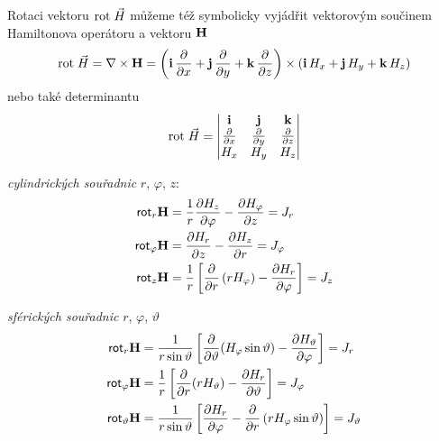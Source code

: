       Rotaci vektoru $\mathrm{rot}\;\vec{H}$ můžeme též symbolicky vyjádřit vektorovým součinem Hamiltonova
      operátoru a vektoru $\mathbf{H}$
      \begin{equation}\label{TEMP:eq_amp_z7}
        \mathrm{rot}\;\vec{H}  = \nabla\times\mathbf{H} = \left(\mathbf{i}\,\frac{\partial  }{\partial x} + 
                   \mathbf{j}\,\frac{\partial  }{\partial y} + \mathbf{k}\,\frac{\partial  }{\partial z}\right)\times(\mathbf{i}\,H_x +
                   \mathbf{j}\,H_y + \mathbf{k}\,H_z)
      \end{equation}         
      nebo také determinantu
      \begin{equation}\label{TEMP:eq_amp_z8}
        \mathrm{rot}\;\vec{H} = \begin{vmatrix}
                    \mathbf{i}       & \mathbf{j}      & \mathbf{k}      \\
                    \frac{\partial  }{\partial x}  & \frac{\partial  }{\partial y} & \frac{\partial  }{\partial z} \\ 
                    H_x          & H_y         & H_z         \\
                  \end{vmatrix}      
      \end{equation}  
      \begin{minipage}[t]{0.4\textwidth}%
        \emph{cylindrických souřadnic} $r$, $\varphi$, $z$:
        \begin{align}\label{TEMP:eq_amp_z9}
          \textsf{rot}_r\mathbf{H}       
            &= \frac{1}{r}\frac{\partial H_z}{\partial \varphi} - \frac{\partial H_\varphi}{\partial z} = J_r          \\ \nonumber 
          \textsf{rot}_\varphi\mathbf{H} 
            &= \frac{\partial H_r}{\partial z} - \frac{\partial H_z}{\partial r}                        = J_\varphi    \\ \nonumber
          \textsf{rot}_z\mathbf{H}       
            &= \frac{1}{r}\left[\frac{\partial  }{\partial r}
               \left(rH_\varphi\right)-\frac{\partial H_r}{\partial \varphi}\right]   = J_z                                  
        \end{align} 
      \end{minipage}
      \begin{minipage}[t]{0.6\textwidth}%
        \emph{sférických souřadnic} $r$, $\varphi$, $\vartheta$ 
        \begin{align}\label{TEMP:eq_amp_z10}
          \textsf{rot}_r\mathbf{H}        
             &= \frac{1}{r\sin\vartheta}\left[\frac{\partial  }{\partial \vartheta}(H_\varphi\sin\vartheta) - 
                \frac{\partial H_\vartheta}{\partial \varphi}\right]                     = J_r          \\  \nonumber 
          \textsf{rot}_\varphi\mathbf{H}   
             &= \frac{1}{r}\left[\frac{\partial  }{\partial r}(rH_\vartheta) - 
                \frac{\partial H_r}{\partial \vartheta}\right]                           = J_\varphi    \\  \nonumber
          \textsf{rot}_\vartheta\mathbf{H} 
             &= \frac{1}{r\sin\vartheta}\left[\frac{\partial H_r}{\partial \varphi} -
                \frac{\partial  }{\partial r}\left(rH_\varphi\sin\vartheta\right)\right] = J_\vartheta    
      \end{align} 
      \end{minipage}
